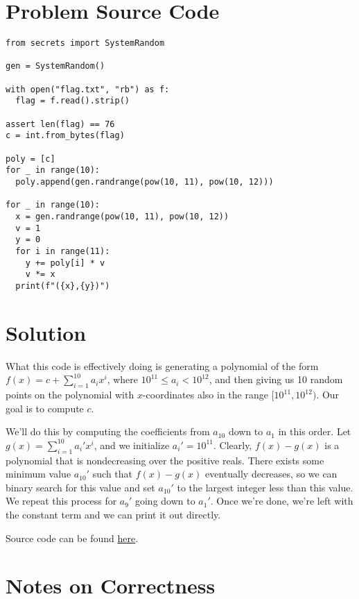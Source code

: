 \documentclass[10pt]{article}
\begin{document}
\begin{flushleft}

\section*{Problem Source Code}

\begin{verbatim}
from secrets import SystemRandom

gen = SystemRandom()

with open("flag.txt", "rb") as f:
  flag = f.read().strip()

assert len(flag) == 76
c = int.from_bytes(flag)

poly = [c]
for _ in range(10):
  poly.append(gen.randrange(pow(10, 11), pow(10, 12)))

for _ in range(10):
  x = gen.randrange(pow(10, 11), pow(10, 12))
  v = 1
  y = 0
  for i in range(11):
    y += poly[i] * v
    v *= x
  print(f"({x},{y})")
\end{verbatim}

\section*{Solution}

What this code is effectively doing is generating a polynomial of the form $f(x) = c + \displaystyle\sum_{i=1}^{10} a_i x^i$, where $10^{11} \le a_i < 10^{12}$,
and then giving us 10 random points on the polynomial with $x$-coordinates also in the range $[10^{11}, 10^{12})$. Our goal is to compute $c$.

We'll do this by computing the coefficients from $a_{10}$ down to $a_{1}$ in this order. Let $g(x) = \sum_{i=1}^{10} a_i' x^i$, and we initialize $a_i' = 10^{11}$.
Clearly, $f(x) - g(x)$ is a polynomial that is nondecreasing over the positive reals. There exists some minimum value $a_{10}'$ such that 
$f(x) - g(x)$ eventually decreases, so we can binary search for this value and set $a_{10}'$ to the largest integer less than this value. We
repeat this process for $a_9'$ going down to $a_1'$. Once we're done, we're left with the constant term and we can print it out directly.

Source code can be found \href{https://gist.github.com/xiaowuc1/0203aeb28acc4f70ec6ad4a59d2fa7d7}{here}.

\section*{Notes on Correctness}


\end{flushleft}
\end{document}
